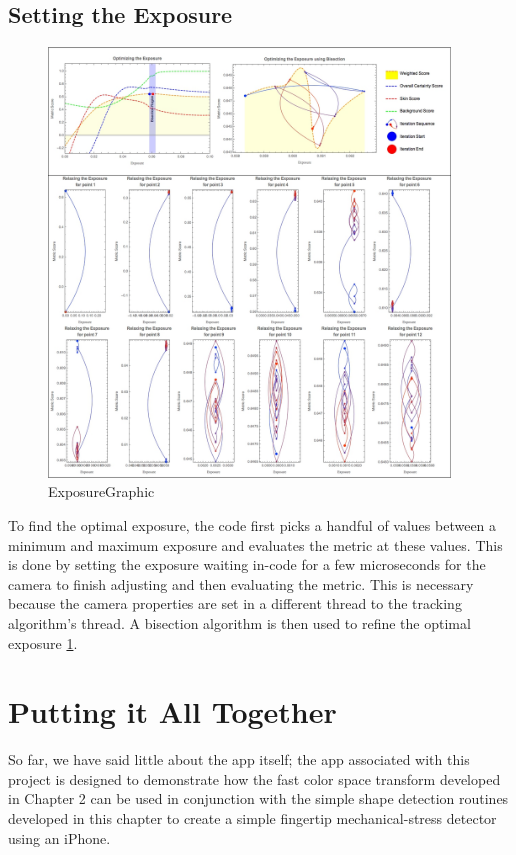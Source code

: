 \subsection{Setting the Exposure}\label{sec:SettingTheExposure}
\begin{figure}[h!]
  \centering
    \includegraphics[width=0.95\textwidth]{Chapter4/Figs/exposureGraphic1.jpg}
    \caption{ExposureGraphic}\label{fig:ExposureGraphic1}
\end{figure}
To find the optimal exposure, the code first picks a handful of values between a minimum and maximum exposure and evaluates the metric at these values. This is done by setting the exposure waiting in-code for a few microseconds for the camera to finish adjusting and then evaluating the metric. This is necessary because the camera properties are set in a different thread to the tracking algorithm's thread. A bisection algorithm is then used to refine the optimal exposure \ref{fig:ExposureGraphic1}.


\section{Putting it All Together}\label{sec:PuttingItAllTogether}
So far, we have said little about the app itself; the app associated with this project is designed to demonstrate how the fast color space transform developed in Chapter 2 can be used in conjunction with the simple shape detection routines developed in this chapter to create a simple fingertip mechanical-stress detector using an iPhone.

